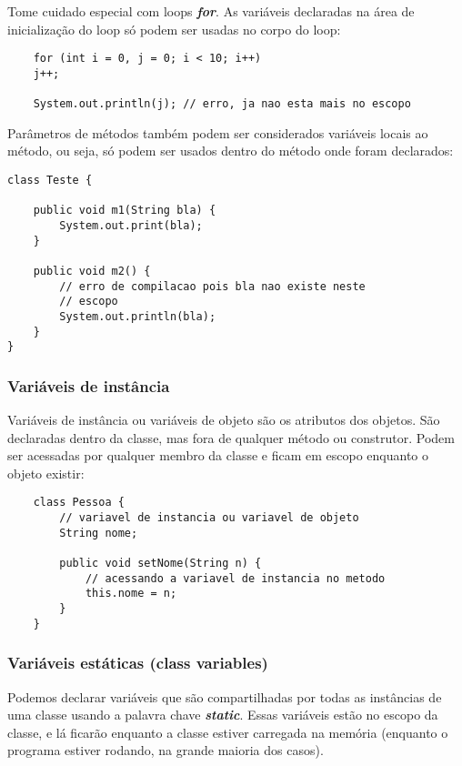 \documentclass[12pt]{article}
\begin{document}
Tome cuidado especial com loops \textbf{\textit{for}}. As variáveis declaradas na área de inicialização do loop só podem ser usadas no corpo do loop:

\begin{lstlisting}
	for (int i = 0, j = 0; i < 10; i++)
	j++;

	System.out.println(j); // erro, ja nao esta mais no escopo
\end{lstlisting}

Parâmetros de métodos também podem ser considerados variáveis locais ao método, ou seja, só podem ser usados dentro do método onde foram declarados:

\begin{lstlisting}
class Teste {
	
	public void m1(String bla) {
		System.out.print(bla);
	}
	
	public void m2() {
		// erro de compilacao pois bla nao existe neste
		// escopo
		System.out.println(bla);
	}
}
\end{lstlisting}

\subsubsection{Variáveis de instância}

Variáveis de instância ou variáveis de objeto são os atributos dos objetos. São declaradas dentro da classe, mas fora de qualquer método ou construtor. Podem ser acessadas por qualquer membro da classe e ficam em escopo enquanto o objeto existir:

\begin{lstlisting}
	class Pessoa {
		// variavel de instancia ou variavel de objeto
		String nome;
		
		public void setNome(String n) {
			// acessando a variavel de instancia no metodo
			this.nome = n;
		}
	}
\end{lstlisting}

\subsubsection{Variáveis estáticas (class variables)}

Podemos declarar variáveis que são compartilhadas por todas as instâncias de uma classe usando a palavra chave \textbf{\textit{static}}. Essas variáveis estão no escopo da classe, e lá ficarão enquanto a classe estiver carregada na memória (enquanto o programa estiver rodando, na grande maioria dos casos).
\end{document}
